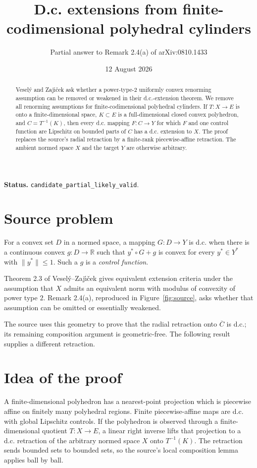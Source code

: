 \documentclass[11pt]{article}
\title{D.c. extensions from finite-codimensional polyhedral cylinders}
\author{Partial answer to Remark 2.4(a) of arXiv:0810.1433}
\date{12 August 2026}
\newcommand{\R}{\mathbb R}
\begin{document}
\maketitle

\noindent\textbf{Status.} \texttt{candidate\_partial\_likely\_valid}.

\begin{abstract}
Vesel\'y and Zaj\'{\i}\v{c}ek ask whether a power-type-$2$ uniformly convex
renorming assumption can be removed or weakened in their d.c.-extension
theorem. We remove all renorming assumptions for finite-codimensional
polyhedral cylinders. If $T:X\to E$ is onto a finite-dimensional space,
$K\subset E$ is a full-dimensional closed convex polyhedron, and
$C=T^{-1}(K)$, then every d.c. mapping $F:C\to Y$ for which $F$ and
one control function are Lipschitz on bounded parts of $C$ has a d.c.
extension to $X$. The proof replaces the source's radial retraction by a
finite-rank piecewise-affine retraction. The ambient normed space $X$ and
the target $Y$ are otherwise arbitrary.
\end{abstract}

\section{Source problem}

For a convex set $D$ in a normed space, a mapping $G:D\to Y$ is d.c.
when there is a continuous convex $g:D\to\R$ such that
$y^*\circ G+g$ is convex for every $y^*\in Y^*$ with
$\|y^*\|\le1$. Such a $g$ is a \emph{control function}.

Theorem 2.3 of Vesel\'y--Zaj\'{\i}\v{c}ek \cite{source} gives equivalent
extension criteria under the assumption that $X$ admits an equivalent norm
with modulus of convexity of power type $2$. Remark 2.4(a), reproduced in
Figure~\ref{fig:source}, asks whether that assumption can be omitted or
essentially weakened.

The source uses this geometry to prove that the radial retraction onto
$\overline C$ is d.c.; its remaining composition argument is geometric-free.
The following result supplies a different retraction.

\section{Idea of the proof}

A finite-dimensional polyhedron has a nearest-point projection which is
piecewise affine on finitely many polyhedral regions. Finite piecewise-affine
maps are d.c. with global Lipschitz controls. If the polyhedron is observed
through a finite-dimensional quotient $T:X\to E$, a linear right inverse
lifts that projection to a d.c. retraction of the arbitrary normed space
$X$ onto $T^{-1}(K)$. The retraction sends bounded sets to bounded sets,
so the source's local composition lemma applies ball by ball.
\end{document}
